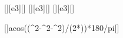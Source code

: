 [\kilo\newton][e3][\N]
[\kilo\newton][e3][\N]
[\kilo\newton][e3][\N]

[\arccos{}]{acos((\FRkX^2-\FEaX^2-\FEbX^2)/(2*\FEaX*\FEbX))*180/pi}[\degree]
